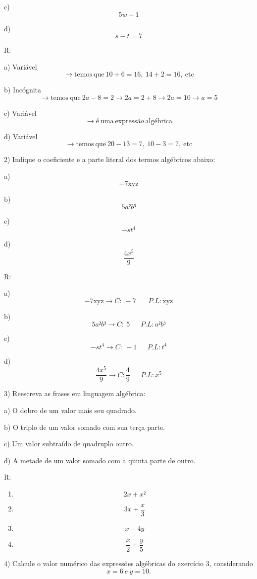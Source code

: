 c) \[5w - 1\]

d) \[s - t = 7\]

R:

a) Variável
\[\rightarrow \text{temos}\ \text{que}\ 10 + 6 = 16,\ 14 + 2 = 16,\ \text{etc}\]

b) Incógnita
\[\rightarrow \text{temos}\ \text{que}\ 2a - 8 = 2 \rightarrow 2a = 2 + 8 \rightarrow 2a = 10 \rightarrow a = 5\]

c) Variável
\[\rightarrow é\ \text{uma}\ \text{express}ão\ \text{alg}é\text{brica}\]

d) Variável
\[\rightarrow \text{temos}\ \text{que}\ 20 - 13 = 7,\ 10 - 3 = 7,\ \text{etc}\]

2) Indique o coeficiente e a parte literal dos termos algébricos abaixo:

a) \[- 7\text{xyz}\]

b) \[5a²b³\]

c) \[- st^{4}\]

d) \[\frac{4x^{5}}{9}\]

R:

a) \[- 7\text{xyz} \rightarrow C:\  - 7\ \ \ \ \ \ \ \ P.L:\text{xyz}\]

b) \[5a²b³ \rightarrow C:\ 5\ \ \ \ \ \ \ P.L:a²b³\]

c) \[- st^{4} \rightarrow C:\  - 1\ \ \ \ \ \ \ P.L:t^{4}\]

d)
\[\frac{4x^{5}}{9} \rightarrow C:\frac{4}{9}{\ \ \ \ \ \ \ }P.L:x^{5}\]

3) Reescreva as frases em linguagem algébrica:

a) O dobro de um valor mais seu quadrado.

b) O triplo de um valor somado com sua terça parte.

c) Um valor subtraído de quadruplo outro.

d) A metade de um valor somado com a quinta parte de outro.

R:

\begin{enumerate}
\def\labelenumi{\alph{enumi})}
\item
  \[2x + x²\]
\item
  \[3x + \frac{x}{3}\]
\item
  \[x - 4y\]
\item
  \[\frac{x}{2} + \frac{y}{5}\]
\end{enumerate}

4) Calcule o valor numérico das expressões algébricas do exercício 3,
considerando \[x = 6\ e\ y = 10.\]

